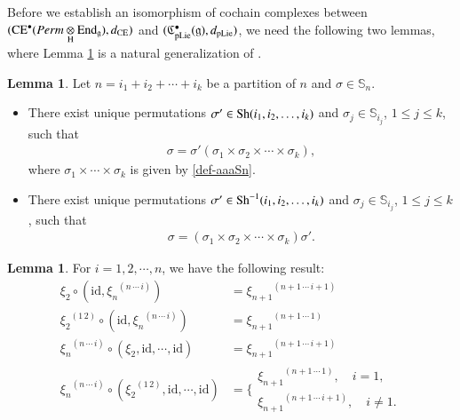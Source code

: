 \documentclass[12pt]{amsart}
\theoremstyle{definition}
\newtheorem{lem}[thm]{Lemma}
\newcommand{\g}{\mathfrak g}
\newcommand{\frkC}{\mathfrak C}
\newcommand{\id}{\mathrm{id}}
\newcommand{\End}{\mathrm{End}}
\newcommand{\ot}{\otimes}
\newcommand{\ceo}{{\rm CE}^{\bullet}}
\newcommand{\Sh}{{\rm Sh}}
\newcommand{\pl}{{\rm pLie}}
\begin{document}
Before we establish an isomorphism of cochain complexes between
$(\ceo(Perm\underset{\rm H}{\ot}\End_\g),d_{\rm CE})$ and
$(\frkC_{\pl}^\bullet(\g),d_\pl)$, we need the following two lemmas, where Lemma \ref{decomp-Sh} is a natural generalization of \cite[Lemma 1.3.3]{LV}.

\begin{lem}\label{decomp-Sh}
	Let $n=i_1+i_2+\cdots+i_k$ be a partition of $n$ and
	$\sigma\in\mathbb{S}_n$.
	\begin{itemize}
		\label{Sh-decom}
		\item[\textrm{(i)}]
		There exist unique permutations
		$\sigma'\in\Sh(i_1,i_2,\ldots,i_k)$ and
		$\sigma_j\in\mathbb{S}_{i_j}$, $1\leq j\leq k$, such that
		\begin{align*}
			\sigma
			=\sigma'(\sigma_1\times\sigma_2\times\cdots\times\sigma_k),
		\end{align*}
		where $\sigma_1\times\cdots\times\sigma_k$ is given by
		\eqref{def-aaaSn}.
		
		\label{Sh-inverse-decom}
		\item[\textrm{(ii)}]
		There exist unique permutations
		$\sigma'\in\Sh^{-1}(i_1,i_2,\ldots,i_k)$ and
		$\sigma_j\in\mathbb{S}_{i_j}$, $1\leq j\leq k$, such that
		\begin{align*}
			\sigma
			=(\sigma_1\times\sigma_2\times\cdots\times\sigma_k)\sigma'.
		\end{align*}
	\end{itemize}
\end{lem}

\begin{lem}\label{pf-in-preL}
For $i=1,2,\cdots,n$, we have the following result:
\begin{align}
\xi_2\circ(\id,{\xi_n}^{(n\,\cdots\,i)})&={\xi_{n+1}}^{(n+1\,\cdots\,i+1)}\label{pf-in-preL-1}\\
{\xi_2}^{(1\,2)}\circ(\id, {\xi_n}^{(n\,\cdots\,i)})&={\xi_{n+1}}^{(n+1\,\cdots\,1)}\label{pf-in-preL-2}\\
{\xi_{n}}^{(n\,\cdots\,i)}\circ({\xi_2},\id,\cdots,\id)&={\xi_{n+1}}^{(n+1\,\cdots\,i+1)}\label{pf-in-preL-3}\\
	{\xi_{n}}^{(n\,\cdots\,i)}\circ({\xi_2}^{(1\,2)},\id,\cdots,\id)&=
\bigg\{
\begin{array}{l}
	{\xi_{n+1}}^{(n+1\,\cdots\,1)},\quad i=1,\\[2mm]
	{\xi_{n+1}}^{(n+1\,\cdots\,i+1)},\quad i\neq1.
\end{array}\label{pf-in-preL-4}
\end{align}
\end{lem}
\end{document}
